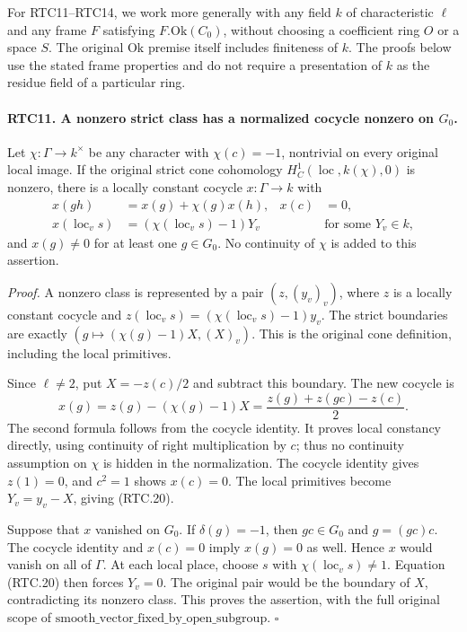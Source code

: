 For RTC11--RTC14, we work more generally with any field \(k\) of
characteristic \(\ell\) and any frame \(F\) satisfying
\(F.\mathrm{Ok}(C_0)\), without choosing a coefficient ring \(O\)
or a space \(S\).  The original \(\mathrm{Ok}\) premise itself
includes finiteness of \(k\).  The proofs below use the stated
frame properties and do not require a presentation of \(k\) as
the residue field of a particular ring.

\paragraph{RTC11. A nonzero strict class has a normalized cocycle nonzero on \(G_0\).}
\label{claim:RTC11}
Let \(\chi:\Gamma\to k^\times\) be any character with
\(\chi(c)=-1\), nontrivial on every original local image.
If the original strict cone cohomology
\(H^1_C(\operatorname{loc},k(\chi),0)\) is nonzero, there
is a locally constant cocycle \(x:\Gamma\to k\) with
\[
 \begin{aligned}
 x(gh)&=x(g)+\chi(g)x(h),& x(c)&=0,\\
 x(\operatorname{loc}_v s)&=(\chi(\operatorname{loc}_v s)-1)Y_v
       &&\text{for some }Y_v\in k,
 \end{aligned}                                             \tag{RTC.20}
\]
and \(x(g)\ne0\) for at least one \(g\in G_0\).
No continuity of \(\chi\) is added to this assertion.

\emph{Proof.}
A nonzero class is represented by a pair \((z,(y_v)_v)\),
where \(z\) is a locally constant cocycle and
\(z(\operatorname{loc}_v s)=(\chi(\operatorname{loc}_v s)-1)y_v\).
The strict boundaries are exactly
\((g\mapsto(\chi(g)-1)X,(X)_v)\).  This is the original
cone definition, including the local primitives.

Since \(\ell\ne2\), put \(X=-z(c)/2\) and subtract this
boundary.  The new cocycle is
\[
 x(g)=z(g)-(\chi(g)-1)X
      =\frac{z(g)+z(gc)-z(c)}2.
                                                        \tag{RTC.21}
\]
The second formula follows from the cocycle identity.  It proves
local constancy directly, using continuity of right multiplication
by \(c\); thus no continuity assumption on \(\chi\) is hidden
in the normalization.  The cocycle identity gives \(z(1)=0\),
and \(c^2=1\) shows \(x(c)=0\).  The local primitives become
\(Y_v=y_v-X\), giving (RTC.20).

Suppose that \(x\) vanished on \(G_0\).  If
\(\delta(g)=-1\), then \(gc\in G_0\) and
\(g=(gc)c\).  The cocycle identity and \(x(c)=0\) imply
\(x(g)=0\) as well.  Hence \(x\) would vanish on all of
\(\Gamma\).  At each local place, choose \(s\) with
\(\chi(\operatorname{loc}_v s)\ne1\).  Equation (RTC.20)
then forces \(Y_v=0\).  The original pair would be the
boundary of \(X\), contradicting its nonzero class.  This proves
the assertion, with the full original scope of
\(\mathrm{smooth\_vector\_fixed\_by\_open\_subgroup}\).
\hfill\(\square\)

